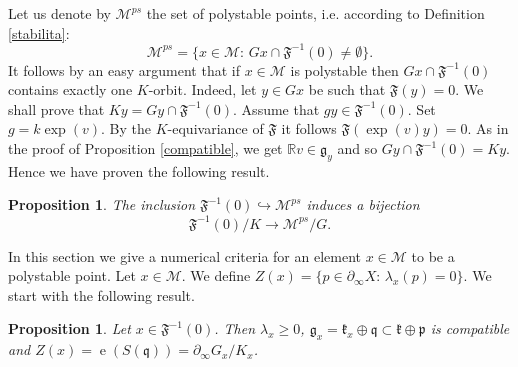 \documentclass[leqno,11pt, a4]{amsart}
\newtheorem{prop}[equation]{Proposition}
\theoremstyle{named}
\begin{document}
Let us denote by ${\mathscr{M}}^{ps}$ the set of polystable points, i.e. according to Definition \ref{stabilita}:
$$
{\mathscr{M}}^{ps}=\{x\in {\mathscr{M}}:\, G x \cap {\mathfrak{F}}^{-1}(0) \neq {\emptyset}\}.
$$
It follows by an easy argument that if $x\in {\mathscr{M}}$ is polystable then $G x\cap {\mathfrak{F}}^{-1}(0)$ contains exactly one $K$-orbit. 
Indeed, let $y\in G x$ be such that ${\mathfrak{F}} (y)=0$. We shall prove that $K y=G y \cap {\mathfrak{F}}^{-1}(0)$. Assume that $g y\in {\mathfrak{F}}^{-1}(0)$. Set
$g=k\exp(v)$. By the $K$-equivariance of ${\mathfrak{F}}$ it follows ${\mathfrak{F}} (\exp(v) y)=0$. As in the proof of Proposition \ref{compatible}, we get ${\mathbb{R}} v\in \mathfrak g_y$ and so $G y \cap {\mathfrak{F}}^{-1} (0)=K y$.
Hence we have proven the following result.
\begin{prop}
The inclusion ${\mathfrak{F}}^{-1}(0) \hookrightarrow {\mathscr{M}}^{ps}$ induces a bijection
\[
{\mathfrak{F}}^{-1}(0)/K {\longrightarrow} {\mathscr{M}}^{ps} /G.
\]
\end{prop}
In this section we give a numerical criteria for an element $x\in {\mathscr{M}}$ to be a polystable point.
Let $x\in {\mathscr{M}}$. We define $Z(x)=\{p\in {\partial_\infty X}:\, {\lambda}_x (p)=0 \}.$
We start with the following result.
\begin{prop}\label{polistabile-tits}
Let $x\in {\mathfrak{F}}^{-1} (0)$. Then ${\lambda}_x \geq 0$, ${\mathfrak{g}}_x = {\mathfrak{k}}_x \oplus  {\mathfrak{q}} \subset {\mathfrak{k}}\oplus{\mathfrak{p}}$ is compatible
and $Z(x) = {\operatorname{e}}(S({\mathfrak{q}}))=\partial_\infty G_x /K_x$.
  \end{prop}
\end{document}
